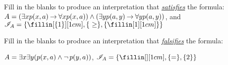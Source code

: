 \documentclass[addpoints]{exam}
\begin{document}
\begin{questions}
\vspace{5mm}
\bonusquestion[2] Fill in the blanks to produce an interpretation that
\emph{\underline{satisfies}} the formula:\\[2mm]
$A = (\exists x p(x,a) \mathbin{\rightarrow} \forall x p(x,a)) \land (\exists y p(a,y) \mathbin{\rightarrow} \forall y p(a,y))$, and $\mathcal{I}_A = \{\fillin[\{1\}][1cm], \{\ \geq \}, \{\fillin[1][1cm]\} \}$

\bonusquestion[2] Fill in the blanks to produce an interpretation that
\emph{\underline{falsifies}} the formula: 

$A = \exists x \exists y (p(x,a) \land \mathop{\neg} p(y,a))$, $\mathcal{I}_A = \{\fillin[][1cm], \{ = \}, \{2\} \}$


\end{questions}
\end{document}
